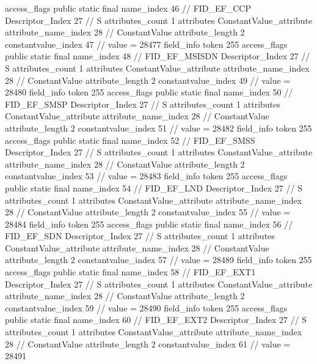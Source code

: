{{{{{				access_flags	public static final
				name_index	46		// FID_EF_CCP
				Descriptor_Index	27		// S
				attributes_count	1
				attributes {
				ConstantValue_attribute {
					attribute_name_index	28		// ConstantValue
					attribute_length	2
					constantvalue_index	47		// value = 28477
				}
				}
			}
			field_info {
				token	255
				access_flags	public static final
				name_index	48		// FID_EF_MSISDN
				Descriptor_Index	27		// S
				attributes_count	1
				attributes {
				ConstantValue_attribute {
					attribute_name_index	28		// ConstantValue
					attribute_length	2
					constantvalue_index	49		// value = 28480
				}
				}
			}
			field_info {
				token	255
				access_flags	public static final
				name_index	50		// FID_EF_SMSP
				Descriptor_Index	27		// S
				attributes_count	1
				attributes {
				ConstantValue_attribute {
					attribute_name_index	28		// ConstantValue
					attribute_length	2
					constantvalue_index	51		// value = 28482
				}
				}
			}
			field_info {
				token	255
				access_flags	public static final
				name_index	52		// FID_EF_SMSS
				Descriptor_Index	27		// S
				attributes_count	1
				attributes {
				ConstantValue_attribute {
					attribute_name_index	28		// ConstantValue
					attribute_length	2
					constantvalue_index	53		// value = 28483
				}
				}
			}
			field_info {
				token	255
				access_flags	public static final
				name_index	54		// FID_EF_LND
				Descriptor_Index	27		// S
				attributes_count	1
				attributes {
				ConstantValue_attribute {
					attribute_name_index	28		// ConstantValue
					attribute_length	2
					constantvalue_index	55		// value = 28484
				}
				}
			}
			field_info {
				token	255
				access_flags	public static final
				name_index	56		// FID_EF_SDN
				Descriptor_Index	27		// S
				attributes_count	1
				attributes {
				ConstantValue_attribute {
					attribute_name_index	28		// ConstantValue
					attribute_length	2
					constantvalue_index	57		// value = 28489
				}
				}
			}
			field_info {
				token	255
				access_flags	public static final
				name_index	58		// FID_EF_EXT1
				Descriptor_Index	27		// S
				attributes_count	1
				attributes {
				ConstantValue_attribute {
					attribute_name_index	28		// ConstantValue
					attribute_length	2
					constantvalue_index	59		// value = 28490
				}
				}
			}
			field_info {
				token	255
				access_flags	public static final
				name_index	60		// FID_EF_EXT2
				Descriptor_Index	27		// S
				attributes_count	1
				attributes {
				ConstantValue_attribute {
					attribute_name_index	28		// ConstantValue
					attribute_length	2
					constantvalue_index	61		// value = 28491
}}}}}}}
